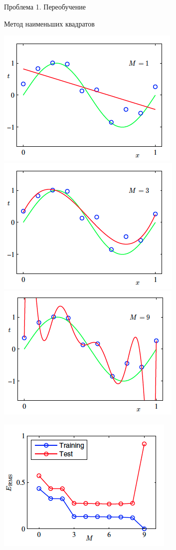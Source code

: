 \documentclass[aspectratio=169]{beamer}
\begin{document}
\begin{frame}{Проблема 1. Переобучение}

Метод наименьших квадратов

\begin{center}
\includegraphics[scale=0.3]{images/m1.png}
\includegraphics[scale=0.3]{images/m2.png}
\includegraphics[scale=0.3]{images/m3.png}

\includegraphics[scale=0.3]{images/of.png}
\end{center}

\end{frame}
\end{document}
